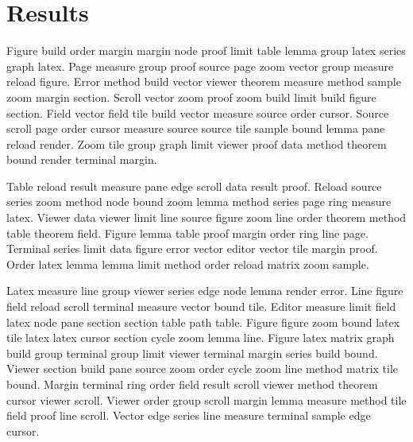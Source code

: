 \section{Results}

Figure build order margin margin node proof limit table lemma group latex series graph latex.
Page measure group proof source page zoom vector group measure reload figure.
Error method build vector viewer theorem measure method sample zoom margin section.
Scroll vector zoom proof zoom build limit build figure section.
Field vector field tile build vector measure source order cursor.
Source scroll page order cursor measure source source tile sample bound lemma pane reload render.
Zoom tile group graph limit viewer proof data method theorem bound render terminal margin.

Table reload result measure pane edge scroll data result proof.
Reload source series zoom method node bound zoom lemma method series page ring measure latex.
Viewer data viewer limit line source figure zoom line order theorem method table theorem field.
Figure lemma table proof margin order ring line page.
Terminal series limit data figure error vector editor vector tile margin proof.
Order latex lemma lemma limit method order reload matrix zoom sample.

Latex measure line group viewer series edge node lemma render error.
Line figure field reload scroll terminal measure vector bound tile.
Editor measure limit field latex node pane section section table path table.
Figure figure zoom bound latex tile latex latex cursor section cycle zoom lemma line.
Figure latex matrix graph build group terminal group limit viewer terminal margin series build bound.
Viewer section build pane source zoom order cycle zoom line method matrix tile bound.
Margin terminal ring order field result scroll viewer method theorem cursor viewer scroll.
Viewer order group scroll margin lemma measure method tile field proof line scroll.
Vector edge series line measure terminal sample edge cursor.
